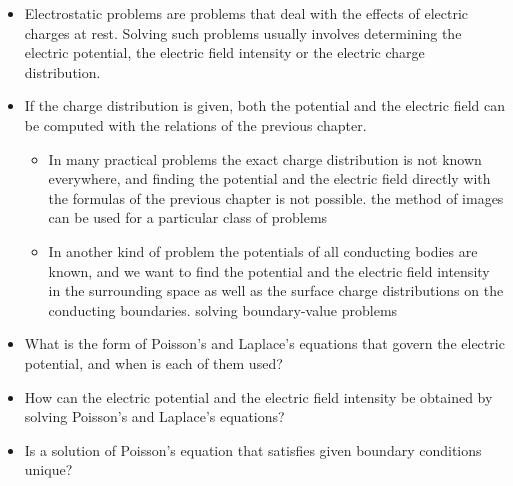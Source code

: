 \ELhold


\begin{ELunit}


\end{ELunit}

\ELhold


\begin{ELunit}

\begin{itemize}
\tightlist
\item
  Electrostatic problems are problems that deal with the effects of electric charges at rest. Solving such problems usually involves determining the electric potential, the electric field intensity or the electric charge distribution.
\item
  If the charge distribution is given, both the potential and the electric field can be computed with the relations of the previous chapter.

  \begin{itemize}
  \tightlist
  \item
    In many practical problems the exact charge distribution is not known everywhere, and finding the potential and the electric field directly with the formulas of the previous chapter is not possible. \ELim{\ELto} the method of images can be used for a particular class of problems
  \item
    In another kind of problem the potentials of all conducting bodies are known, and we want to find the potential and the electric field intensity in the surrounding space as well as the surface charge distributions on the conducting boundaries. \ELim{\ELto} solving boundary-value problems
  \end{itemize}
\end{itemize}


\begin{itemize}
\tightlist
\item
  What is the form of Poisson's and Laplace's equations that govern the electric potential, and when is each of them used?
\item
  How can the electric potential and the electric field intensity be obtained by solving Poisson's and Laplace's equations?
\item
  Is a solution of Poisson's equation that satisfies given boundary conditions unique?
\end{itemize}

\end{ELunit}

